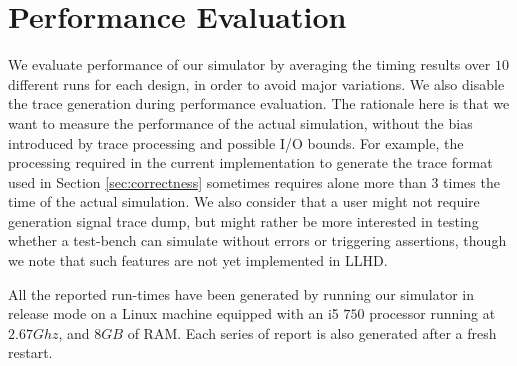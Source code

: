 \section{Performance Evaluation}
We evaluate performance of our simulator by averaging the timing results over $10$ different runs for each design, in order to avoid major variations. We also disable the trace generation during performance evaluation. The rationale here is that we want to measure the performance of the actual simulation, without the bias introduced by trace processing and possible I/O bounds. For example, the processing required in the current implementation to generate the trace format used in Section \ref{sec:correctness} sometimes requires alone more than $3$ times the time of the actual simulation. We also consider that a user might not require generation signal trace dump, but might rather be more interested in testing whether a test-bench can simulate without errors or triggering assertions, though we note that such features are not yet implemented in LLHD.

All the reported run-times have been generated by running our simulator in release mode on a Linux machine equipped with an i5 $750$ processor running at $2.67Ghz$, and $8GB$ of RAM. Each series of report is also generated after a fresh restart.


